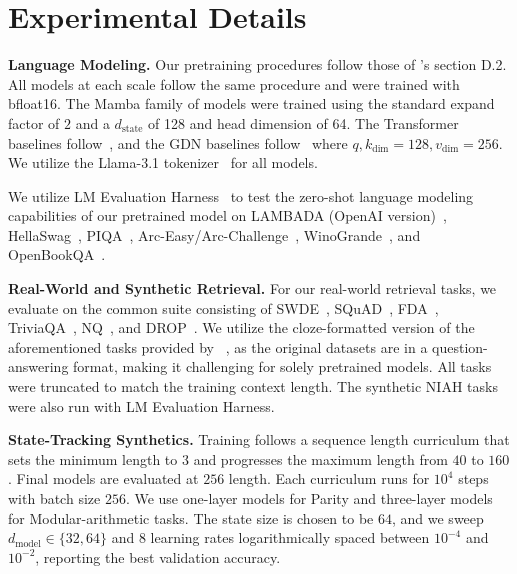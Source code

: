 \section{Experimental Details}
\label{app:exp-details}

\textbf{Language Modeling.}
Our pretraining procedures follow those of \citet{dao2024transformersssmsgeneralizedmodels}'s section D.2. All models at each scale follow the same procedure and were trained with bfloat16. The Mamba family of models were trained using the standard expand factor of $2$ and a $d_\text{state}$ of 128 and head dimension of 64. The Transformer baselines follow~\citet{dao2024transformersssmsgeneralizedmodels}, and the GDN baselines follow~\citep{yang2025gateddeltanetworksimproving} where $q,k_\text{dim}=128,v_\text{dim}=256$. We utilize the Llama-3.1 tokenizer~\citep{grattafiori2024llama3herdmodels} for all models.

We utilize LM Evaluation Harness~\citep{eval-harness} to test the zero-shot language modeling capabilities of our pretrained model on LAMBADA (OpenAI version)~\citep{paperno2016lambadadatasetwordprediction}, HellaSwag~\citep{zellers2019hellaswagmachinereallyfinish}, PIQA~\citep{bisk2019piqareasoningphysicalcommonsense}, Arc-Easy/Arc-Challenge~\citep{clark2018thinksolvedquestionanswering}, WinoGrande~\citep{sakaguchi2019winograndeadversarialwinogradschema}, and OpenBookQA~\citep{mihaylov2018suitarmorconductelectricity}.

\textbf{Real-World and Synthetic Retrieval.}
For our real-world retrieval tasks, we evaluate on the common suite consisting of SWDE~\citep{arora2025simplelinearattentionlanguage}, SQuAD~\citep{Rajpurkar2018SQuAD2}, FDA~\citep{arora2025simplelinearattentionlanguage}, TriviaQA~\citep{joshi2017triviaqalargescaledistantly}, NQ~\citep{kwiatkowski-etal-2019-natural}, and DROP~\citep{dua2019dropreadingcomprehensionbenchmark}. We utilize the cloze-formatted version of the aforementioned tasks provided by ~\citet{arora2025simplelinearattentionlanguage,arora2024justreadtwiceclosing}, as the original datasets are in a question-answering format, making it challenging for solely pretrained models. All tasks were truncated to match the training context length. The synthetic NIAH tasks~\citep{hsieh2024rulerwhatsrealcontext} were also run with LM Evaluation Harness. 

\textbf{State-Tracking Synthetics.}
Training follows a sequence length curriculum that sets the minimum length to $3$ and progresses the maximum length from $40$ to $160$.
Final models are evaluated at $256$ length.
Each curriculum runs for $10^{4}$ steps with batch size $256$. 
We use one-layer models for Parity and three-layer models for Modular-arithmetic tasks. 
The state size is chosen to be $64$,
and we sweep $d_{\text{model}}\in\{32,64\}$ and $8$ learning rates logarithmically spaced between $10^{-4}$ and $10^{-2}$, reporting the best validation accuracy.
